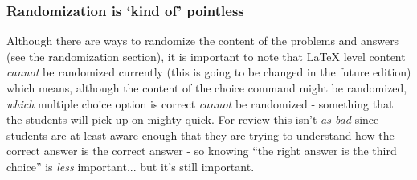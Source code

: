 \documentclass{ximera}
\begin{document}
        \subsubsection*{Randomization is `kind of' pointless}
            Although there are ways to randomize the content of the problems and answers (see the randomization section), it is important to note that LaTeX level content \textit{cannot} be randomized currently (this is going to be changed in the future edition) which means, although the content of the choice command might be randomized, \textit{which} multiple choice option is correct \textit{cannot} be randomized - something that the students will pick up on mighty quick. For review this isn't \textit{as bad} since students are at least aware enough that they are trying to understand how the correct answer is the correct answer - so knowing ``the right answer is the third choice'' is \textit{less} important... but it's still important.
            
        
\end{document}
